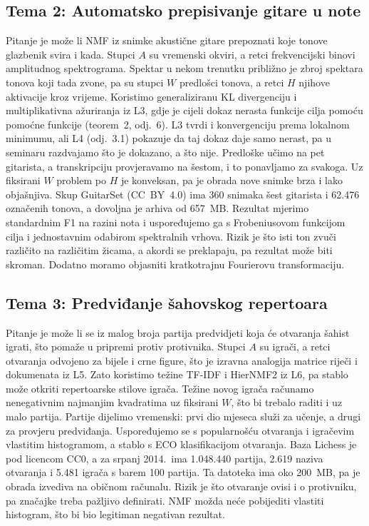 \documentclass[10pt,a4paper]{article}
\begin{document}
\subsection*{Tema 2: Automatsko prepisivanje gitare u note}
Pitanje je može li NMF iz snimke akustične gitare prepoznati koje tonove glazbenik svira i kada.
Stupci $A$ su vremenski okviri, a retci frekvencijski binovi amplitudnog spektrograma.
Spektar u nekom trenutku približno je zbroj spektara tonova koji tada zvone, pa su stupci $W$
predlošci tonova, a retci $H$ njihove aktivacije kroz vrijeme.
Koristimo generaliziranu KL divergenciju i multiplikativna ažuriranja iz L3, gdje je cijeli dokaz
nerasta funkcije cilja pomoću pomoćne funkcije (teorem~2, odj.~6).
L3 tvrdi i konvergenciju prema lokalnom minimumu, ali L4 (odj.~3.1) pokazuje da taj dokaz daje
samo nerast, pa u seminaru razdvajamo što je dokazano, a što nije.
Predloške učimo na pet gitarista, a transkripciju provjeravamo na šestom, i to ponavljamo za svakoga.
Uz fiksirani $W$ problem po $H$ je konveksan, pa je obrada nove snimke brza i lako objašnjiva.
Skup GuitarSet (CC~BY~4.0) ima 360 snimaka šest gitarista i 62.476 označenih tonova, a dovoljna je
arhiva od 657~MB.
Rezultat mjerimo standardnim F1 na razini nota i uspoređujemo ga s Frobeniusovom funkcijom cilja i
jednostavnim odabirom spektralnih vrhova.
Rizik je što isti ton zvuči različito na različitim žicama, a akordi se preklapaju, pa rezultat
može biti skroman.
Dodatno moramo objasniti kratkotrajnu Fourierovu transformaciju.

\subsection*{Tema 3: Predviđanje šahovskog repertoara}
Pitanje je može li se iz malog broja partija predvidjeti koja će otvaranja šahist igrati, što
pomaže u pripremi protiv protivnika.
Stupci $A$ su igrači, a retci otvaranja odvojeno za bijele i crne figure, što je izravna analogija
matrice riječi i dokumenata iz L5.
Zato koristimo težine TF-IDF i HierNMF2 iz L6, pa stablo može otkriti repertoarske stilove igrača.
Težine novog igrača računamo nenegativnim najmanjim kvadratima uz fiksirani $W$, što bi trebalo
raditi i uz malo partija.
Partije dijelimo vremenski: prvi dio mjeseca služi za učenje, a drugi za provjeru predviđanja.
Uspoređujemo se s popularnošću otvaranja i igračevim vlastitim histogramom, a stablo s ECO
klasifikacijom otvaranja.
Baza Lichess je pod licencom CC0, a za srpanj 2014.\ ima 1.048.440 partija, 2.619 naziva otvaranja
i 5.481 igrača s barem 100 partija.
Ta datoteka ima oko 200~MB, pa je obrada izvediva na običnom računalu.
Rizik je što otvaranje ovisi i o protivniku, pa značajke treba pažljivo definirati.
NMF možda neće pobijediti vlastiti histogram, što bi bio legitiman negativan rezultat.
\end{document}
